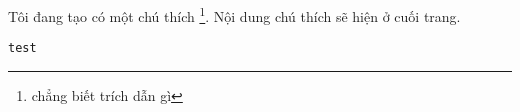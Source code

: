 \documentclass[a4paper, 14pt]{report}
\begin{document}
Tôi đang tạo có một chú thích \footnote{chẳng biết trích dẫn gì}. Nội dung chú thích sẽ hiện ở cuối trang.

\texttt{test}
\end{document}
